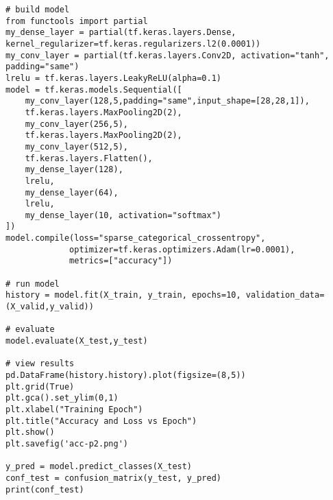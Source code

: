 \documentclass[a4paper,10 pt]{article}
\begin{document}
\begin{lstlisting}
# build model
from functools import partial
my_dense_layer = partial(tf.keras.layers.Dense, kernel_regularizer=tf.keras.regularizers.l2(0.0001))
my_conv_layer = partial(tf.keras.layers.Conv2D, activation="tanh", padding="same")
lrelu = tf.keras.layers.LeakyReLU(alpha=0.1)
model = tf.keras.models.Sequential([
    my_conv_layer(128,5,padding="same",input_shape=[28,28,1]),
    tf.keras.layers.MaxPooling2D(2),
    my_conv_layer(256,5),
    tf.keras.layers.MaxPooling2D(2),
    my_conv_layer(512,5),
    tf.keras.layers.Flatten(),
    my_dense_layer(128),
    lrelu,
    my_dense_layer(64),
    lrelu,
    my_dense_layer(10, activation="softmax")
])
model.compile(loss="sparse_categorical_crossentropy",
             optimizer=tf.keras.optimizers.Adam(lr=0.0001),
             metrics=["accuracy"])

# run model
history = model.fit(X_train, y_train, epochs=10, validation_data=(X_valid,y_valid))

# evaluate
model.evaluate(X_test,y_test)

# view results
pd.DataFrame(history.history).plot(figsize=(8,5))
plt.grid(True)
plt.gca().set_ylim(0,1)
plt.xlabel("Training Epoch")
plt.title("Accuracy and Loss vs Epoch")
plt.show()
plt.savefig('acc-p2.png')

y_pred = model.predict_classes(X_test)
conf_test = confusion_matrix(y_test, y_pred)
print(conf_test)
\end{lstlisting}
\end{document}
